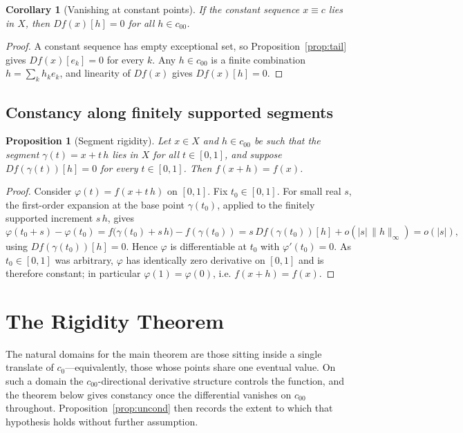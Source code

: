 \documentclass[11pt]{amsart}
\newcommand{\cc}{c_{00}}
\newcommand{\czero}{c_{0}}
\theoremstyle{plain}
\newtheorem{corollary}[theorem]{Corollary}
\newtheorem{proposition}[theorem]{Proposition}
\theoremstyle{definition}
\theoremstyle{remark}
\begin{document}
\begin{corollary}[Vanishing at constant points]
\label{cor:constant}
If the constant sequence $x\equiv c$ lies in $X$, then $Df(x)[h]=0$ for all
$h\in\cc$.
\end{corollary}

\begin{proof}
A constant sequence has empty exceptional set, so
Proposition~\ref{prop:tail} gives $Df(x)[e_k]=0$ for every $k$. Any
$h\in\cc$ is a finite combination $h=\sum_k h_k e_k$, and linearity of
$Df(x)$ gives $Df(x)[h]=0$.
\end{proof}

\subsection{Constancy along finitely supported segments}

\begin{proposition}[Segment rigidity]
\label{prop:segment}
Let $x\in X$ and $h\in\cc$ be such that the segment
$\gamma(t)=x+t\,h$ lies in $X$ for all $t\in[0,1]$, and suppose
$Df(\gamma(t))[h]=0$ for every $t\in[0,1]$. Then $f(x+h)=f(x)$.
\end{proposition}

\begin{proof}
Consider $\varphi(t)=f(x+t\,h)$ on $[0,1]$. Fix $t_0\in[0,1]$. For small
real $s$, the first-order expansion at the base point $\gamma(t_0)$,
applied to the finitely supported increment $s\,h$, gives
\[
  \varphi(t_0+s)-\varphi(t_0)
  = f\bigl(\gamma(t_0)+s\,h\bigr)-f(\gamma(t_0))
  = s\,Df(\gamma(t_0))[h] + o(|s|\,\|h\|_\infty)
  = o(|s|),
\]
using $Df(\gamma(t_0))[h]=0$. Hence $\varphi$ is differentiable at $t_0$
with $\varphi'(t_0)=0$. As $t_0\in[0,1]$ was arbitrary, $\varphi$ has
identically zero derivative on $[0,1]$ and is therefore constant; in
particular $\varphi(1)=\varphi(0)$, i.e. $f(x+h)=f(x)$.
\end{proof}

\section{The Rigidity Theorem}
\label{sec:rigidity-thm}

The natural domains for the main theorem are those sitting inside a single
translate of $\czero$---equivalently, those whose points share one eventual
value. On such a domain the $\cc$-directional derivative structure controls
the function, and the theorem below gives constancy once the differential
vanishes on $\cc$ throughout. Proposition~\ref{prop:uncond} then records the
extent to which that hypothesis holds without further assumption.
\end{document}
